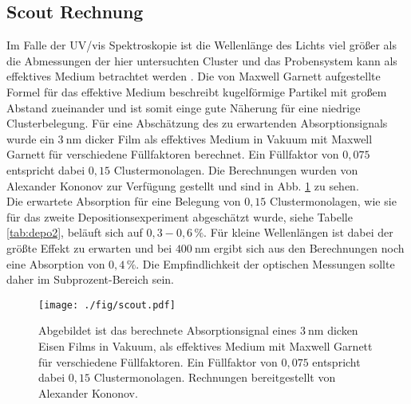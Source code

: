 \subsection{Scout Rechnung}
\label{sec:scoutsim}
Im Falle der UV/vis Spektroskopie ist die Wellenlänge des Lichts viel größer als die Abmessungen der hier untersuchten Cluster und das Probensystem kann als effektives Medium betrachtet werden \cite[S. 149 ff.]{Thei.1993}.
Die von Maxwell Garnett aufgestellte Formel für das effektive Medium beschreibt kugelförmige Partikel mit großem Abstand zueinander und ist somit einge gute Näherung für eine niedrige Clusterbelegung. 
Für eine Abschätzung des zu erwartenden Absorptionsignals wurde ein $\SI{3}{\nm}$ dicker Film als effektives Medium in Vakuum mit Maxwell Garnett für verschiedene Füllfaktoren berechnet.
Ein Füllfaktor von $0,075$ entspricht dabei $0,15$ Clustermonolagen.
Die Berechnungen wurden von Alexander Kononov zur Verfügung gestellt und sind in Abb. \ref{fig:scout} zu sehen.\\
Die erwartete Absorption für eine Belegung von $0,15$ Clustermonolagen, wie sie für das zweite Depositionsexperiment abgeschätzt wurde, siehe Tabelle \ref{tab:depo2}, beläuft sich auf $0,3 - 0,6\,\%$.
Für kleine Wellenlängen ist dabei der größte Effekt zu erwarten und bei $\SI{400}{\nm}$ ergibt sich aus den Berechnungen noch eine Absorption von $0,4\,\%$. Die Empfindlichkeit der optischen Messungen sollte daher im Subprozent-Bereich sein.
\begin{figure}[h]
  \centering
  \texttt{[image: ./fig/scout.pdf]}
  \caption{Abgebildet ist das berechnete Absorptionsignal eines $\SI{3}{\nm}$ dicken Eisen Films in Vakuum, als effektives Medium mit Maxwell Garnett für verschiedene Füllfaktoren. Ein Füllfaktor von $0,075$ entspricht dabei $0,15$ Clustermonolagen. Rechnungen bereitgestellt von Alexander Kononov.}
  \label{fig:scout}
\end{figure}


